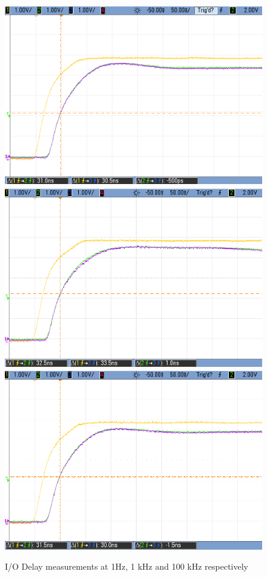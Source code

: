 \begin{figure}[ht]
    \begin{center}
        \includegraphics[width=0.75\linewidth]{images/e3e1_1.png}
        \includegraphics[width=0.75\linewidth]{images/e3e1_1k.png}
        \includegraphics[width=0.75\linewidth]{images/e3e1_100k_.png}
        \caption{I/O Delay measurements at 1Hz, 1 kHz and 100 kHz respectively}
        \label{fig:moore_delays}
    \end{center}
\end{figure}

